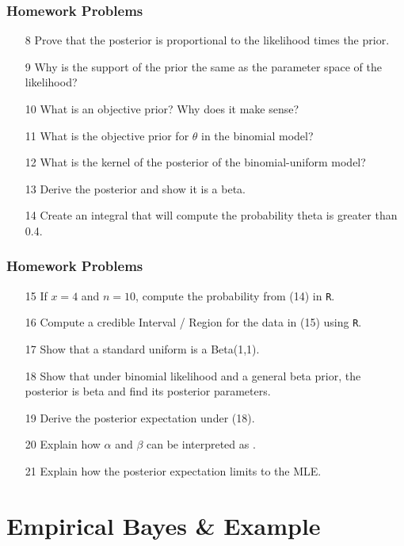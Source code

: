 \documentclass[slides]{beamer} %
\begin{document}
\begin{frame}
	\frametitle{Homework Problems}
\begin{enumerate}
\item[8] Prove that the posterior is proportional to the likelihood times the prior.
\item[9] Why is the support of the prior the same as the parameter space of the likelihood?
\item[10] What is an objective prior? Why does it make sense? 
\item[11] What is the objective prior for $\theta$ in the binomial model?
\item[12] What is the kernel of the posterior of the binomial-uniform model?
\item[13] Derive the posterior and show it is a beta.
\item[14] Create an integral that will compute the probability theta is greater than 0.4.
\end{enumerate}
\end{frame}	

\begin{frame}
	\frametitle{Homework Problems}
\begin{enumerate}
\item[15] If $x = 4$ and $n=10$, compute the probability from (14) in \texttt{R}.
\item[16] Compute a credible Interval / Region for the data in (15) using \texttt{R}.
\item[17] Show that a standard uniform is a Beta(1,1).
\item[18] Show that under binomial likelihood and a general beta prior, the posterior is beta and find its posterior parameters.
\item[19] Derive the posterior expectation under (18).
\item[20] Explain how $\alpha$ and $\beta$ can be interpreted as .
\item[21] Explain how the posterior expectation limits to the MLE.
\end{enumerate}
\end{frame}	

\section{Empirical Bayes \& Example}
\end{document}
